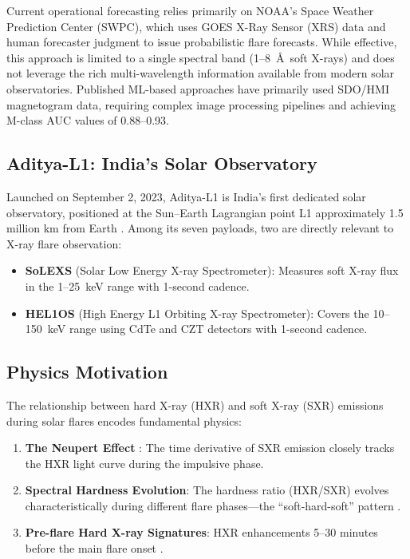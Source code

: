 \documentclass[twocolumn,10pt]{article}
\begin{document}
Current operational forecasting relies primarily on NOAA's Space Weather Prediction Center (SWPC), which uses GOES X-Ray Sensor (XRS) data and human forecaster judgment to issue probabilistic flare forecasts. While effective, this approach is limited to a single spectral band (1--8~\AA\ soft X-rays) and does not leverage the rich multi-wavelength information available from modern solar observatories. Published ML-based approaches \citep{bobra2015,nishizuka2017,li2020} have primarily used SDO/HMI magnetogram data, requiring complex image processing pipelines and achieving M-class AUC values of 0.88--0.93.

\subsection{Aditya-L1: India's Solar Observatory}\label{sec:aditya}

Launched on September 2, 2023, Aditya-L1 is India's first dedicated solar observatory, positioned at the Sun--Earth Lagrangian point L1 approximately 1.5 million km from Earth \citep{isro2023}. Among its seven payloads, two are directly relevant to X-ray flare observation:

\begin{itemize}[nosep]
  \item \textbf{SoLEXS} (Solar Low Energy X-ray Spectrometer): Measures soft X-ray flux in the 1--25~keV range with 1-second cadence.
  \item \textbf{HEL1OS} (High Energy L1 Orbiting X-ray Spectrometer): Covers the 10--150~keV range using CdTe and CZT detectors with 1-second cadence.
\end{itemize}

\subsection{Physics Motivation}\label{sec:physics}

The relationship between hard X-ray (HXR) and soft X-ray (SXR) emissions during solar flares encodes fundamental physics:

\begin{enumerate}[nosep]
  \item \textbf{The Neupert Effect} \citep{neupert1968}: The time derivative of SXR emission closely tracks the HXR light curve during the impulsive phase.
  \item \textbf{Spectral Hardness Evolution}: The hardness ratio (HXR/SXR) evolves characteristically during different flare phases---the ``soft-hard-soft'' pattern \citep{grigis2004}.
  \item \textbf{Pre-flare Hard X-ray Signatures}: HXR enhancements 5--30 minutes before the main flare onset \citep{hudson2020,benz2017}.
\end{enumerate}
\end{document}
